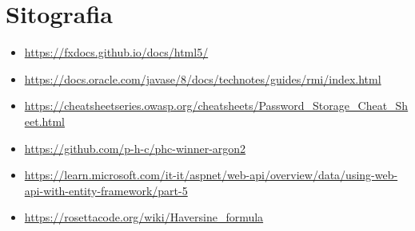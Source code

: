 \section{Sitografia}
\begin{itemize}
  \item \url{https://fxdocs.github.io/docs/html5/}
  \item \url{https://docs.oracle.com/javase/8/docs/technotes/guides/rmi/index.html}
  \item \url{https://cheatsheetseries.owasp.org/cheatsheets/Password_Storage_Cheat_Sheet.html}
  \item \url{https://github.com/p-h-c/phc-winner-argon2}
  \item \url{https://learn.microsoft.com/it-it/aspnet/web-api/overview/data/using-web-api-with-entity-framework/part-5}
  \item \url{https://rosettacode.org/wiki/Haversine_formula}
\end{itemize}
